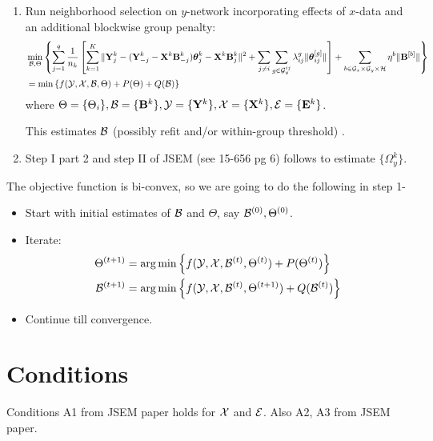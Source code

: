 \documentclass[12pt, letterpaper]{article}
\DeclareMathOperator*{\argmin}{arg\,min}
\numberwithin{equation}{section}
\begin{document}
\begin{enumerate}
\item Run neighborhood selection on $y$-network incorporating effects of $x$-data and an additional blockwise group penalty:
%
\begin{align}
& \min_{{\cal{B}}, \Theta} \left\{ \sum_{j=1}^q  \frac{1}{n_k} \left[ \sum_{k=1}^K \| {\mathbf{Y}}^k_j - ({\mathbf{Y}}_{-j}^k - {\mathbf{X}}^k {\mathbf{B}}_{-j}^k) {\boldsymbol{\theta}}_j^k - {\mathbf{X}}^k {\mathbf{B}}_j^k \|^2 + \sum_{j \neq i} \sum_{g \in {\cal{G}}_y^{ij}} \lambda_{ij}^g \| {\boldsymbol{\theta}}_{ij}^{[g]} \| \right] + \sum_{b \in {\cal{G}}_x \times {\cal{G}}_y \times {\cal{H}}} \eta^b \| {\mathbf{B}}^{[b]} \| \right\}\\
&= \min \left\{ f ( {\cal{Y}}, {\cal{X}}, {\cal{B}}, \Theta) + P (\Theta) + Q ({\cal{B}}) \right\} 
\end{align}
%
where $\Theta = \{ \Theta_i \}, {\cal{B}} = \{ {\mathbf{B}}^k \}, {\cal{Y}} = \{ {\mathbf{Y}}^k \}, {\cal{X}} = \{ {\mathbf{X}}^k \}, {\cal{E}} = \{ {\mathbf{E}}^k \}$.

This estimates ${\cal{B}}$ { \colrbf (possibly refit and/or within-group threshold) }.

\item Step I part 2 and step II of JSEM (see 15-656 pg 6) follows to estimate $\{ \Omega_y^k \}$.
\end{enumerate}

The objective function is bi-convex, so we are going to do the following in step 1-

\begin{itemize}
\item Start with initial estimates of ${\cal{B}}$ and $\Theta$, say ${\cal{B}}^{(0)}, \Theta^{(0)}$.
\item Iterate:
%
\begin{align}
\Theta^{(t+1)} &= \argmin \left\{ f ( \cY, \cX, \cB^{(t)}, \Theta^{(t)}) + P (\Theta^{(t)}) \right\}\\
\cB^{(t+1)} &= \argmin \left\{ f ( \cY, \cX, \cB^{(t)}, \Theta^{(t+1)}) + Q (\cB^{(t)}) \right\}
\end{align}
\item Continue till convergence.
\end{itemize}
%

\section{Conditions}
Conditions A1 from JSEM paper holds for ${\cal{X}}$ and ${\cal{E}}$. Also A2, A3 from JSEM paper.
\end{document}

